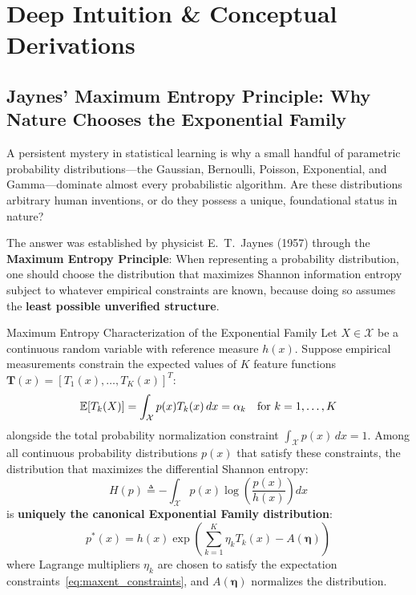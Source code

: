\section{Deep Intuition \& Conceptual Derivations}

\subsection{Jaynes' Maximum Entropy Principle: Why Nature Chooses the Exponential Family}
A persistent mystery in statistical learning is why a small handful of parametric probability distributions---the Gaussian, Bernoulli, Poisson, Exponential, and Gamma---dominate almost every probabilistic algorithm. Are these distributions arbitrary human inventions, or do they possess a unique, foundational status in nature?

The answer was established by physicist E.~T.~Jaynes (1957) through the \textbf{Maximum Entropy Principle}: When representing a probability distribution, one should choose the distribution that maximizes Shannon information entropy subject to whatever empirical constraints are known, because doing so assumes the \textbf{least possible unverified structure}.

\begin{theorembox}{Maximum Entropy Characterization of the Exponential Family}
Let $X \in \mathcal{X}$ be a continuous random variable with reference measure $h(x)$. Suppose empirical measurements constrain the expected values of $K$ feature functions $\mathbf{T}(x) = [T_1(x), \dots, T_K(x)]^T$:
\begin{equation}
\operatorname{\mathbb{E}}[T_k(X)] = \int_{\mathcal{X}} p(x) T_k(x) \, dx = \alpha_k \quad \text{for } k = 1, \dots, K
\label{eq:maxent_constraints}
\end{equation}
alongside the total probability normalization constraint $\int_{\mathcal{X}} p(x) \, dx = 1$.
Among all continuous probability distributions $p(x)$ that satisfy these constraints, the distribution that maximizes the differential Shannon entropy:
\begin{equation}
H(p) \triangleq -\int_{\mathcal{X}} p(x) \log\left( \frac{p(x)}{h(x)} \right) dx
\end{equation}
is \textbf{uniquely the canonical Exponential Family distribution}:
\begin{equation}
p^*(x) = h(x) \exp\left( \sum_{k=1}^K \eta_k T_k(x) - A(\boldsymbol{\eta}) \right)
\end{equation}
where Lagrange multipliers $\eta_k$ are chosen to satisfy the expectation constraints~\eqref{eq:maxent_constraints}, and $A(\boldsymbol{\eta})$ normalizes the distribution.
\end{theorembox}

